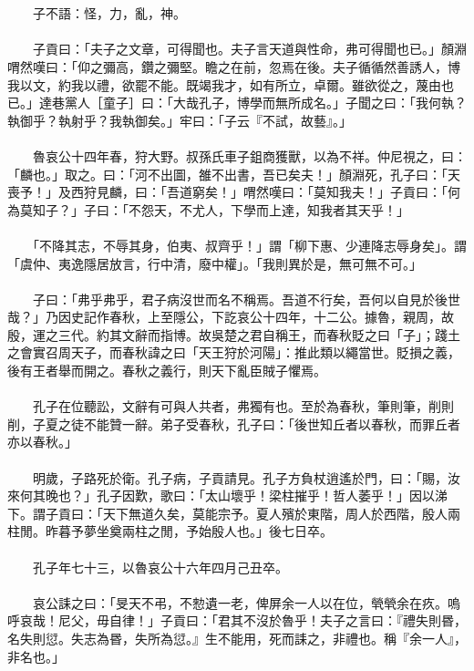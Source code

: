 \\\\
　　子不語：怪，力，亂，神。
\\\\
　　子貢曰：「夫子之文章，可得聞也。夫子言天道與性命，弗可得聞也已。」顏淵喟然嘆曰：「仰之彌高，鑽之彌堅。瞻之在前，忽焉在後。夫子循循然善誘人，博我以文，約我以禮，欲罷不能。既竭我才，如有所立，卓爾。雖欲從之，蔑由也已。」達巷黨人［童子］曰：「大哉孔子，博學而無所成名。」子聞之曰：「我何執？執御乎？執射乎？我執御矣。」牢曰：「子云『不試，故藝』。」
\\\\
　　魯哀公十四年春，狩大野。叔孫氏車子鉏商獲獸，以為不祥。仲尼視之，曰：「麟也。」取之。曰：「河不出圖，雒不出書，吾已矣夫！」顏淵死，孔子曰：「天喪予！」及西狩見麟，曰：「吾道窮矣！」喟然嘆曰：「莫知我夫！」子貢曰：「何為莫知子？」子曰：「不怨天，不尤人，下學而上達，知我者其天乎！」
\\\\
　　「不降其志，不辱其身，伯夷、叔齊乎！」謂「柳下惠、少連降志辱身矣」。謂「虞仲、夷逸隱居放言，行中清，廢中權」。「我則異於是，無可無不可。」
\\\\
　　子曰：「弗乎弗乎，君子病沒世而名不稱焉。吾道不行矣，吾何以自見於後世哉？」乃因史記作春秋，上至隱公，下訖哀公十四年，十二公。據魯，親周，故殷，運之三代。約其文辭而指博。故吳楚之君自稱王，而春秋貶之曰「子」；踐土之會實召周天子，而春秋諱之曰「天王狩於河陽」：推此類以繩當世。貶損之義，後有王者舉而開之。春秋之義行，則天下亂臣賊子懼焉。
\\\\
　　孔子在位聽訟，文辭有可與人共者，弗獨有也。至於為春秋，筆則筆，削則削，子夏之徒不能贊一辭。弟子受春秋，孔子曰：「後世知丘者以春秋，而罪丘者亦以春秋。」
\\\\
　　明歲，子路死於衛。孔子病，子貢請見。孔子方負杖逍遙於門，曰：「賜，汝來何其晚也？」孔子因歎，歌曰：「太山壞乎！梁柱摧乎！哲人萎乎！」因以涕下。謂子貢曰：「天下無道久矣，莫能宗予。夏人殯於東階，周人於西階，殷人兩柱閒。昨暮予夢坐奠兩柱之閒，予始殷人也。」後七日卒。
\\\\
　　孔子年七十三，以魯哀公十六年四月己丑卒。
\\\\
　　哀公誄之曰：「旻天不弔，不愸遺一老，俾屏余一人以在位，煢煢余在疚。嗚呼哀哉！尼父，毋自律！」子貢曰：「君其不沒於魯乎！夫子之言曰：『禮失則昬，名失則愆。失志為昬，失所為愆。』生不能用，死而誄之，非禮也。稱『余一人』，非名也。」
